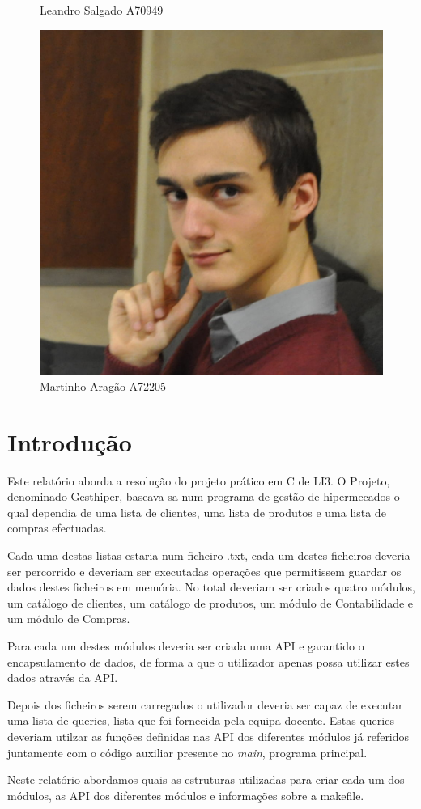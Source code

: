 \documentclass[10pt] {article}
\begin{document}
\begin{figure}[!htb]
  \caption{Leandro Salgado A70949}\label{fig:awesome_image2}
\endminipage\hfill
{}%
  \includegraphics[width=\linewidth]{ma.jpg}
  \caption{Martinho Aragão A72205}
\endminipage
\end{figure}

\newpage

\tableofcontents

\newpage

\section{Introdução}
\par Este relatório aborda a resolução do projeto prático em C de LI3. O Projeto, denominado Gesthiper, baseava-sa 
num programa de gestão de hipermecados o qual dependia de uma lista de clientes, uma lista de produtos e uma 
lista de compras efectuadas. \par Cada uma destas listas estaria num ficheiro .txt, cada um destes ficheiros deveria 
ser percorrido e deveriam ser executadas operações que permitissem guardar os dados destes ficheiros em 
memória. No total deveriam ser criados quatro módulos, um catálogo de clientes, um catálogo de produtos, um 
módulo de Contabilidade e um módulo de Compras.
\par Para cada um destes módulos deveria ser criada uma API e garantido o encapsulamento de dados, de forma 
a que o utilizador apenas possa utilizar estes dados através da API.
\par Depois dos ficheiros serem carregados o utilizador deveria ser capaz de executar uma lista de queries, lista que 
foi fornecida pela equipa docente. Estas queries deveriam utilzar as funções definidas nas API dos diferentes 
módulos já referidos juntamente com o código auxiliar presente no \emph{main}, programa principal.
\par Neste relatório abordamos quais as estruturas utilizadas para criar cada um dos módulos, as API dos diferentes 
módulos e informações sobre a makefile.
\end{document}
